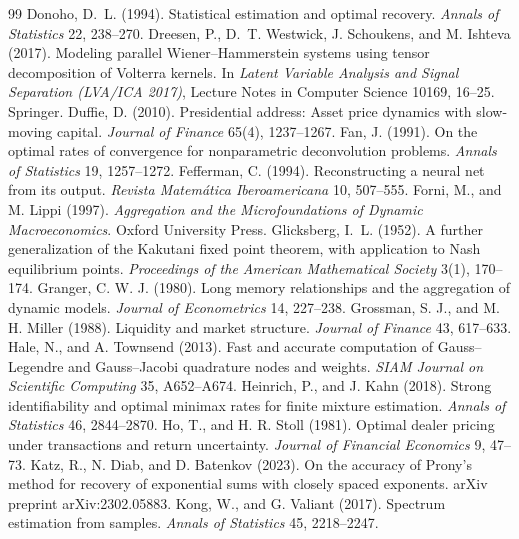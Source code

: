 \documentclass[12pt]{article}
\theoremstyle{definition}
\theoremstyle{remark}
\begin{document}
\begin{thebibliography}{99}
 Donoho, D.~L. (1994). Statistical estimation and optimal recovery. \emph{Annals of Statistics} 22, 238--270.
 Dreesen, P., D.~T. Westwick, J. Schoukens, and M. Ishteva (2017). Modeling parallel Wiener--Hammerstein systems using tensor decomposition of Volterra kernels. In \emph{Latent Variable Analysis and Signal Separation (LVA/ICA 2017)}, Lecture Notes in Computer Science 10169, 16--25. Springer.
 Duffie, D. (2010). Presidential address: Asset price dynamics with slow-moving capital. \emph{Journal of Finance} 65(4), 1237--1267.
 Fan, J. (1991). On the optimal rates of convergence for nonparametric deconvolution problems. \emph{Annals of Statistics} 19, 1257--1272.
 Fefferman, C. (1994). Reconstructing a neural net from its output. \emph{Revista Matem\'atica Iberoamericana} 10, 507--555.
 Forni, M., and M. Lippi (1997). \emph{Aggregation and the Microfoundations of Dynamic Macroeconomics}. Oxford University Press.
 Glicksberg, I.~L. (1952). A further generalization of the Kakutani fixed point theorem, with application to Nash equilibrium points. \emph{Proceedings of the American Mathematical Society} 3(1), 170--174.
 Granger, C. W. J. (1980). Long memory relationships and the aggregation of dynamic models. \emph{Journal of Econometrics} 14, 227--238.
 Grossman, S. J., and M. H. Miller (1988). Liquidity and market structure. \emph{Journal of Finance} 43, 617--633.
 Hale, N., and A. Townsend (2013). Fast and accurate computation of Gauss--Legendre and Gauss--Jacobi quadrature nodes and weights. \emph{SIAM Journal on Scientific Computing} 35, A652--A674.
 Heinrich, P., and J. Kahn (2018). Strong identifiability and optimal minimax rates for finite mixture estimation. \emph{Annals of Statistics} 46, 2844--2870.
 Ho, T., and H. R. Stoll (1981). Optimal dealer pricing under transactions and return uncertainty. \emph{Journal of Financial Economics} 9, 47--73.
 Katz, R., N. Diab, and D. Batenkov (2023). On the accuracy of Prony's method for recovery of exponential sums with closely spaced exponents. arXiv preprint arXiv:2302.05883.
 Kong, W., and G. Valiant (2017). Spectrum estimation from samples. \emph{Annals of Statistics} 45, 2218--2247.

\end{thebibliography}
\end{document}
